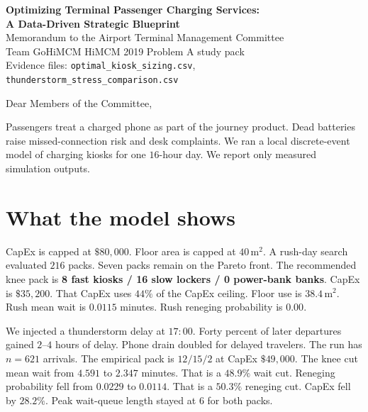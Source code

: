 \documentclass[11pt]{article}
\begin{document}
\begin{center}
{\Large\bfseries Optimizing Terminal Passenger Charging Services:\\
A Data-Driven Strategic Blueprint}\\[0.6em]
{\normalsize Memorandum to the Airport Terminal Management Committee}\\[0.25em]
{\small Team GoHiMCM \quad HiMCM 2019 Problem A study pack}\\[0.15em]
{\small Evidence files: \texttt{optimal\_kiosk\_sizing.csv},
\texttt{thunderstorm\_stress\_comparison.csv}}
\end{center}

\vspace{0.8em}
\noindent
Dear Members of the Committee,

\medskip
\noindent
Passengers treat a charged phone as part of the journey product.
Dead batteries raise missed-connection risk and desk complaints.
We ran a local discrete-event model of charging kiosks for one
$16$-hour day.
We report only measured simulation outputs.

\section*{What the model shows}
CapEx is capped at $\$80{,}000$.
Floor area is capped at $40\,\mathrm{m}^2$.
A rush-day search evaluated $216$ packs.
Seven packs remain on the Pareto front.
The recommended knee pack is
\textbf{8 fast kiosks / 16 slow lockers / 0 power-bank banks}.
CapEx is $\$35{,}200$.
That CapEx uses $44\%$ of the CapEx ceiling.
Floor use is $38.4\,\mathrm{m}^2$.
Rush mean wait is $0.0115$ minutes.
Rush reneging probability is $0.00$.

We injected a thunderstorm delay at $17{:}00$.
Forty percent of later departures gained $2$--$4$ hours of delay.
Phone drain doubled for delayed travelers.
The run has $n=621$ arrivals.
The empirical pack is $12/15/2$ at CapEx $\$49{,}000$.
The knee cut mean wait from $4.591$ to $2.347$ minutes.
That is a $48.9\%$ wait cut.
Reneging probability fell from $0.0229$ to $0.0114$.
That is a $50.3\%$ reneging cut.
CapEx fell by $28.2\%$.
Peak wait-queue length stayed at $6$ for both packs.
\end{document}
